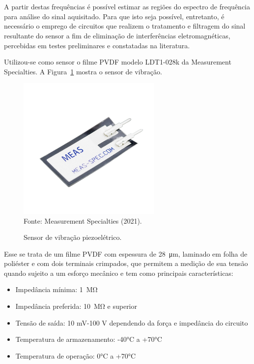 \documentclass[
	12pt,				
	oneside,			
	a4paper,			
	english,			
	brazil,			
	]{abntex2ppgsi}
\begin{document}
\section{}
\label{secao:CircuitosCondicionnadores}

A partir destas frequências é possível estimar as regiões do espectro de frequência para análise do sinal aquisitado. Para que isto seja possível, entretanto, é necessário o emprego de circuitos que realizem o tratamento e filtragem do sinal resultante do sensor a fim de eliminação de interferências eletromagnéticas, percebidas em testes preliminares e constatadas na literatura.  

Utilizou-se como sensor o filme PVDF modelo LDT1-028k da Measurement Specialties. A Figura~\ref{Figura21} mostra o sensor de vibração. 

\begin{figure}[H]
\centering
\caption {Sensor de vibração piezoelétrico.}
\includegraphics[width=\textwidth,height=70mm,keepaspectratio]{Figura21} 
\label{Figura21} \\
Fonte: Measurement Specialties (2021).
\end{figure} 

Esse se trata de um filme PVDF com espessura de \SI{28}{\micro\meter}, laminado em folha de poliéster e com dois terminais crimpados, que permitem a medição de sua tensão quando sujeito a um esforço mecânico e tem como principais características: 

\begin{itemize}
	\item Impedância mínima: \SI{1}{\mega\ohm}
	\item Impedância preferida: \SI{10}{\mega\ohm} e superior
	\item Tensão de saída: 10 mV-100 V dependendo da força e impedância do circuito
	\item Temperatura de armazenamento: -40°C a +70°C 
	\item Temperatura de operação: 0°C a +70°C
\end{itemize}
\end{document}
